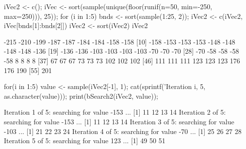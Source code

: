 \documentclass[10pt,letterpaper]{article}
\begin{document}
\begin{Solution}
\begin{Schunk}
\begin{Sinput}
 iVec2 <- c();
 iVec <- sort(sample(unique(floor(runif(n=50, min=-250, max=250))), 25));
 for (i in 1:5) { 
   bnds <- sort(sample(1:25, 2));
   iVec2 <- c(iVec2, iVec[bnds[1]:bnds[2]])
 }
 iVec2 <- sort(iVec2)
 iVec2
\end{Sinput}
\begin{Soutput}
 [1] -215 -210 -199 -187 -187 -184 -184 -158 -158
[10] -158 -153 -153 -153 -148 -148 -148 -148 -136
[19] -136 -136 -103 -103 -103 -103  -70  -70  -70
[28]  -70  -58  -58  -58  -58    8    8    8    8
[37]   67   67   67   73   73   73  102  102  102
[46]  111  111  111  123  123  123  176  176  190
[55]  201
\end{Soutput}
\begin{Sinput}
 for(i in 1:5) {
   value <- sample(iVec2[-1], 1);
   cat(sprintf('Iteration %d of %d: searching for value %s ...\n', 
               i, 5, as.character(value)));
   print(bSearch2(iVec2, value));
 }
\end{Sinput}
\begin{Soutput}
Iteration 1 of 5: searching for value -153 ...
[1] 11 12 13 14
Iteration 2 of 5: searching for value -153 ...
[1] 11 12 13 14
Iteration 3 of 5: searching for value -103 ...
[1] 21 22 23 24
Iteration 4 of 5: searching for value -70 ...
[1] 25 26 27 28
Iteration 5 of 5: searching for value 123 ...
[1] 49 50 51
\end{Soutput}
\end{Schunk}
\end{Solution}
\end{document}
